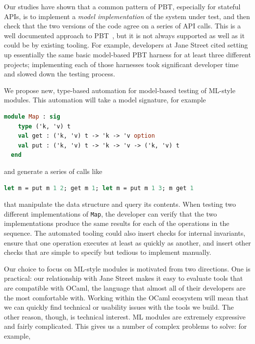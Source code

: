 Our studies have shown that a common pattern of PBT, especially for stateful
APIs, is to implement a {\em model implementation} of the system under test, and
then check that the two versions of the code agree on a series of API calls.
This is a well documented approach to PBT~\cite{hughes_experiences_2016}, but it
is not always supported as well as it could be by existing tooling. For example,
developers at Jane Street cited setting up essentially the same basic
model-based PBT harness for at least three different projects; implementing each
of those harnesses took significant developer time and slowed down the testing
process.

We propose new, type-based automation for model-based testing of ML-style
modules. This automation will take a model signature, for example
\begin{lstlisting}[language=Caml]
  module Map : sig
    type ('k, 'v) t
    val get : ('k, 'v) t -> 'k -> 'v option
    val put : ('k, 'v) t -> 'k -> 'v -> ('k, 'v) t
  end
\end{lstlisting}
and generate a series of calls like
\begin{lstlisting}[language=Caml]
  let m = put m 1 2; get m 1; let m = put m 1 3; m get 1
\end{lstlisting}
that manipulate the data structure and query its contents. When testing two
different implementations of \lstinline{Map}, the developer can verify that the
two implementations produce the same results for each of the operations in the
sequence. The automated tooling could also insert checks for internal
invariants, ensure that one operation executes at least as quickly as another,
and insert other checks that are simple to specify but tedious to implement
manually.

Our choice to focus on ML-style modules is motivated from two directions. One is
practical: our relationship with Jane Street makes it easy to evaluate tools
that are compatible with OCaml, the language that almost all of their developers
are the most comfortable with. Working within the OCaml ecosystem will mean that
we can quickly find technical or usability issues with the tools we build. The
other reason, though, is technical interest. ML modules are extremely
expressive and fairly complicated. This gives us a number of complex problems to
solve: for example, 


